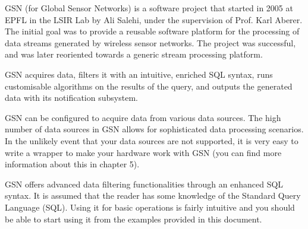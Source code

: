 GSN (for Global Sensor Networks) is a software project that started in
2005 at EPFL in the LSIR Lab by Ali Salehi, under the supervision of
Prof. Karl Aberer. The initial goal was to provide a reusable software
platform for the processing of data streams generated by wireless
sensor networks. The project was successful, and was later reoriented
towards a generic stream processing platform.

GSN acquires data, filters it with an intuitive, enriched SQL syntax,
runs customisable algorithms on the results of the query, and outputs
the generated data with its notification subsystem.

GSN can be configured to acquire data from various data sources. The
high number of data sources in GSN allows for sophisticated data
processing scenarios. In the unlikely event that your data sources are
not supported, it is very easy to write a wrapper to make your hardware
work with GSN (you can find more information about this in chapter 5).

GSN offers advanced data filtering functionalities through an enhanced
SQL syntax. It is assumed that the reader has some knowledge of the
Standard Query Language (SQL). Using it for basic operations is fairly
intuitive and you should be able to start using it from the examples
provided in this document.
